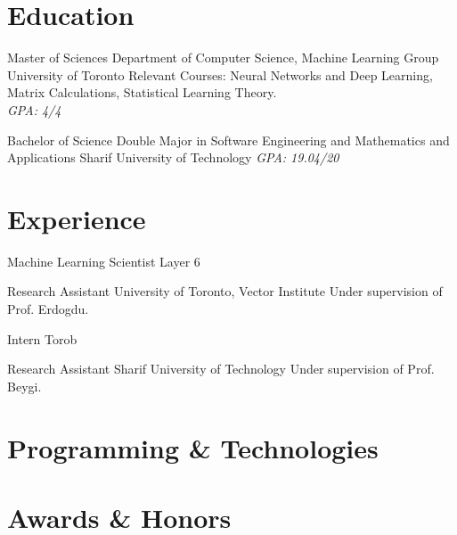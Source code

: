 \documentclass{moderncv}
\begin{document}
\makecvtitle
\section{Education}

{Master of Sciences}
{Department of Computer Science, Machine Learning Group}
{University of Toronto}
{}
{
Relevant Courses:
Neural Networks and Deep Learning,
Matrix Calculations,
Statistical Learning Theory.
\\
\textit{GPA: 4/4}}

{Bachelor of Science}
{Double Major in Software Engineering and Mathematics and Applications}
{Sharif University of Technology}
{}
{\textit{GPA: 19.04/20}} 

\section{Experience}
{Machine Learning Scientist}
{Layer 6}
{}{}{}

{Research Assistant}
{University of Toronto, Vector Institute}
{}{}
{Under supervision of Prof. Erdogdu.}


{Intern}
{Torob}
{}{}{}

{Research Assistant}
{Sharif University of Technology}
{}{}
{Under supervision of Prof. Beygi.}

\nocite{*}



\section{Programming \& Technologies}

\section{Awards \& Honors}
\end{document}
